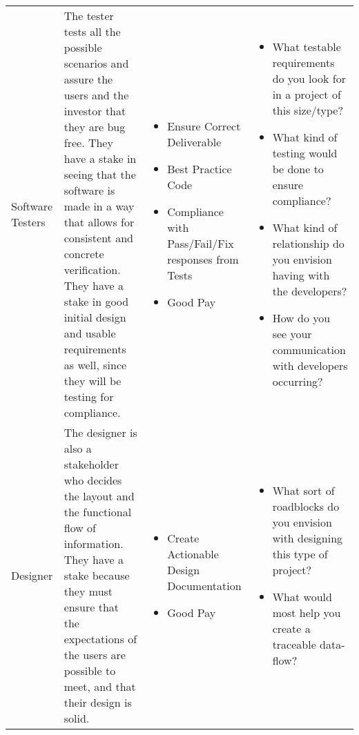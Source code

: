 \documentclass{article}
\begin{document}
\begin{tabular}{ |p{2.5in}|p{2.5in}|p{2.5in}|p{2.5in}|  }
Software Testers & The tester tests all the possible scenarios and assure the users and the investor that they are bug free. They have a stake in seeing that the software is made in a way that allows for consistent and concrete verification.  They have a stake in good initial design and usable requirements as well, since they will be testing for compliance.  &  
\begin{itemize}
  \item Ensure Correct Deliverable
  \item Best Practice Code
  \item Compliance with Pass/Fail/Fix responses from Tests
  \item Good Pay
\end{itemize} & 
\begin{itemize}
  \item What testable requirements do you look for in a project of this size/type?
  \item What kind of testing would be done to ensure compliance?
  \item What kind of relationship do you envision having with the developers?
  \item How do you see your communication with developers occurring?
\end{itemize} \\

Designer & The designer is also a stakeholder who decides the layout and the functional flow of information.  They have a stake because they must ensure that the expectations of the users are possible to meet, and that their design is solid. &  
\begin{itemize}
  \item Create Actionable Design Documentation
  \item Good Pay
\end{itemize} & 
\begin{itemize}
  \item What sort of roadblocks do you envision with designing this type of project?
  \item What would most help you create a traceable data-flow?
\end{itemize} \\


\end{tabular}
\end{document}
